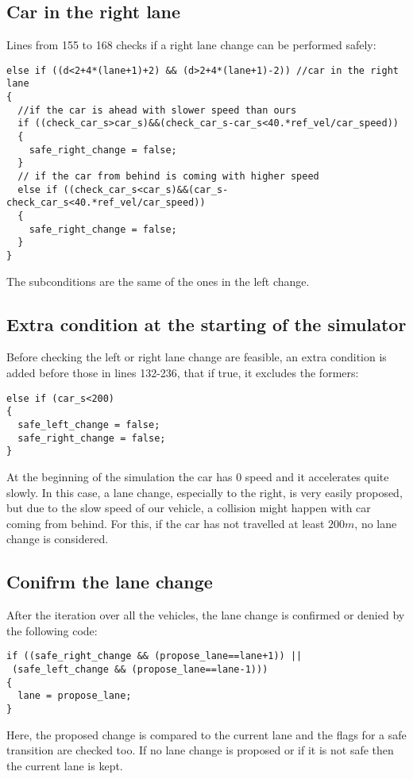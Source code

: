 \documentclass{article}
\begin{document}
\subsection{Car in the right lane}
Lines from 155 to 168 checks if a right lane change can be performed safely:
\begin{lstlisting}
else if ((d<2+4*(lane+1)+2) && (d>2+4*(lane+1)-2)) //car in the right lane
{
  //if the car is ahead with slower speed than ours
  if ((check_car_s>car_s)&&(check_car_s-car_s<40.*ref_vel/car_speed))
  {
    safe_right_change = false;
  }
  // if the car from behind is coming with higher speed
  else if ((check_car_s<car_s)&&(car_s-check_car_s<40.*ref_vel/car_speed))
  {
    safe_right_change = false;
  }
}
\end{lstlisting}
The subconditions are the same of the ones in the left change.
\subsection{Extra condition at the starting of the simulator}
Before checking the left or right lane change are feasible, an extra condition is added before those in lines 132-236, that if true, it excludes the formers:
\begin{lstlisting}
else if (car_s<200) 
{
  safe_left_change = false;
  safe_right_change = false;
}
\end{lstlisting}
At the beginning of the simulation the car has $0$ speed and it accelerates quite slowly. In this case, a lane change, especially to the right, is very easily proposed, but due to the slow speed of our vehicle, a collision might happen with car coming from behind. For this, if the car has not travelled at least $200m$, no lane change is considered.

\subsection{Conifrm the lane change}
After the iteration over all the vehicles, the lane change is confirmed or denied by the following code:
\begin{lstlisting}
if ((safe_right_change && (propose_lane==lane+1)) ||
 (safe_left_change && (propose_lane==lane-1)))
{
  lane = propose_lane;
}
\end{lstlisting}
Here, the proposed change is compared to the current lane and the flags for a safe transition are checked too. If no lane change is proposed or if it is not safe then the current lane is kept.
\end{document}
